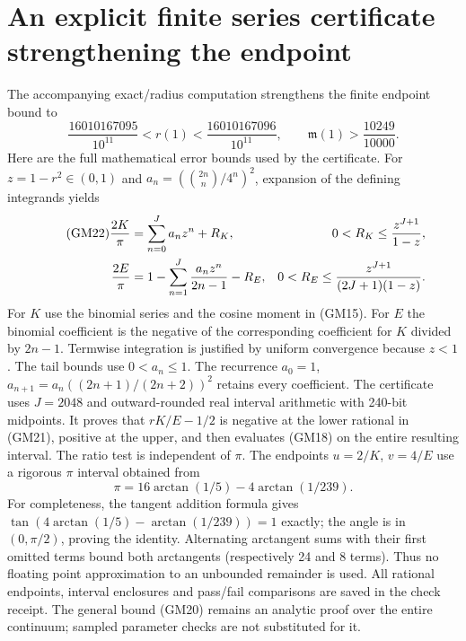 \documentclass[11pt]{article}
\begin{document}
\section{An explicit finite series certificate strengthening the endpoint}
The accompanying exact/radius computation strengthens the finite endpoint
bound to
\begin{equation}\tag{GM21}
 \frac{16010167095}{10^{11}}<r(1)<\frac{16010167096}{10^{11}},
 \qquad \boxed{\mathfrak m(1)>\frac{10249}{10000}.}
\end{equation}
Here are the full mathematical error bounds used by the certificate.
For $z=1-r^2\in(0,1)$ and
$a_n=(\binom{2n}n/4^n)^2$, expansion of the defining integrands yields
\begin{align}\tag{GM22}
 \frac{2K}{\pi}&=\sum_{n=0}^{J}a_nz^n+R_K,
 &0<R_K\le\frac{z^{J+1}}{1-z},\notag\\
 \frac{2E}{\pi}&=1-\sum_{n=1}^{J}\frac{a_nz^n}{2n-1}-R_E,
 &0<R_E\le\frac{z^{J+1}}{(2J+1)(1-z)}.\notag
\end{align}
For $K$ use the binomial series and the cosine moment in (GM15).
For $E$ the binomial coefficient is the negative of the corresponding
coefficient for $K$ divided by $2n-1$. Termwise integration is justified
by uniform convergence because $z<1$. The tail bounds use $0<a_n\le1$.
The recurrence $a_0=1$, $a_{n+1}=a_n((2n+1)/(2n+2))^2$ retains every
coefficient. The certificate uses $J=2048$ and outward-rounded real
interval arithmetic with 240-bit midpoints. It proves that $rK/E-1/2$
is negative at the lower rational in (GM21), positive at the upper,
and then evaluates (GM18) on the entire resulting interval.
The ratio test is independent of $\pi$. The endpoints $u=2/K$,
$v=4/E$ use a rigorous $\pi$ interval obtained from
\[
 \pi=16\arctan(1/5)-4\arctan(1/239).
\]
For completeness, the tangent addition formula gives
$\tan(4\arctan(1/5)-\arctan(1/239))=1$ exactly;
the angle is in $(0,\pi/2)$, proving the identity.
Alternating arctangent sums with their first omitted terms bound both
arctangents (respectively 24 and 8 terms). Thus no floating point
approximation to an unbounded remainder is used. All rational endpoints,
interval enclosures and pass/fail comparisons are saved in the check
receipt. The general bound (GM20) remains an analytic proof over the
entire continuum; sampled parameter checks are not substituted for it.
\end{document}
